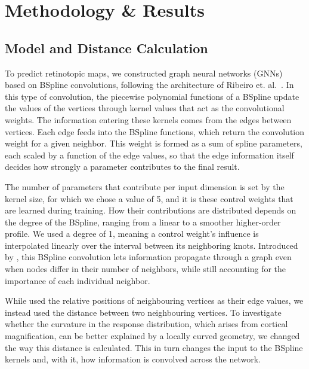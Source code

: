 \section{Methodology \& Results}
\label{sec:method}

\subsection{Model and Distance Calculation}

To predict retinotopic maps, we constructed graph neural networks (GNNs) based on BSpline convolutions,
following the architecture of Ribeiro et. al.\ \cite{ribeiro2021}.
In this type of convolution, the piecewise polynomial functions of a BSpline update the values of the vertices
through kernel values that act as the convolutional weights.
The information entering these kernels comes from the edges between vertices.
Each edge feeds into the BSpline functions, which return the convolution weight for a given neighbor.
This weight is formed as a sum of spline parameters, each scaled by a function of the edge values,
so that the edge information itself decides how strongly a parameter contributes to the final result.

The number of parameters that contribute per input dimension is set by the kernel size, for which we chose a value of 5,
and it is these control weights that are learned during training.
How their contributions are distributed depends on the degree of the BSpline,
ranging from a linear to a smoother higher-order profile.
We used a degree of 1, meaning a control weight's influence is interpolated linearly over the interval between its neighboring knots.
Introduced by \cite{fey2018splinecnn}, this BSpline convolution lets information propagate through a graph
even when nodes differ in their number of neighbors, while still accounting for the importance of each individual neighbor.

While \cite{ribeiro2021} used the relative positions of neighbouring vertices as their edge values, we instead used the distance between two neighbouring vertices.
To investigate whether the curvature in the response distribution, which arises from cortical
magnification, can be better explained by a locally curved geometry, we changed the way this distance is calculated.
This in turn changes the input to the BSpline kernels and, with it, how information is convolved across the network.

